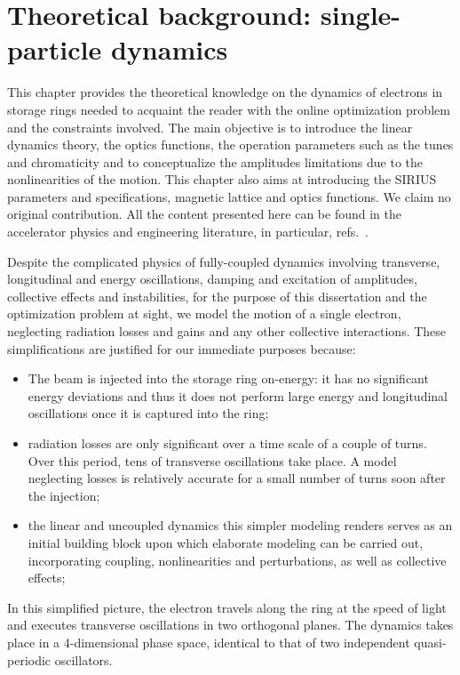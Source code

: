 \chapter{Theoretical background: single-particle dynamics}
This chapter provides the theoretical knowledge on the dynamics of electrons in storage rings needed to acquaint the reader with the online optimization problem and the constraints involved. The main objective is to introduce the linear dynamics theory, the optics functions, the operation parameters such as the tunes and chromaticity and to conceptualize the amplitudes limitations due to the nonlinearities of the motion. This chapter also aims at introducing the SIRIUS parameters and specifications, magnetic lattice and optics functions. We claim no original contribution. All the content presented here can be found in the accelerator physics and engineering literature, in particular, refs.~\cite{sands_physics_1969,lee_accelerator_2004,wiedemann_particle_2015,wolski_beam_2014}.

Despite the complicated physics of fully-coupled dynamics involving transverse, longitudinal and energy oscillations, damping and excitation of amplitudes, collective effects and instabilities, for the purpose of this dissertation and the optimization problem at sight, we model the motion of a single electron, neglecting radiation losses and gains and any other collective interactions. These simplifications are justified for our immediate purposes because:
\begin{itemize}
    \item The beam is injected into the storage ring on-energy: it has no significant energy deviations and thus it does not perform large energy and longitudinal oscillations once it is captured into the ring;
    \item radiation losses are only significant over a time scale of a couple of turns. Over this period, tens of transverse oscillations take place. A model neglecting losses is relatively accurate for a small number of turns soon after the injection;
    \item the linear and uncoupled dynamics this simpler modeling renders serves as an initial building block upon which elaborate modeling can be carried out, incorporating coupling, nonlinearities and perturbations, as well as collective effects;
\end{itemize}
In this simplified picture, the electron travels along the ring at the speed of light and executes transverse oscillations in two orthogonal planes. The dynamics takes place in a 4-dimensional phase space, identical to that of two independent quasi-periodic oscillators.

